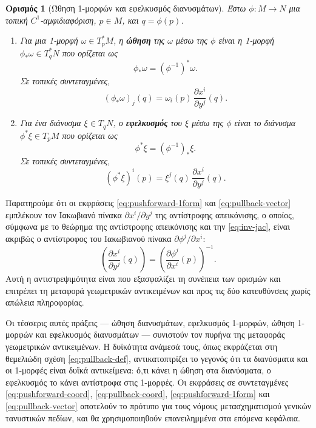 \documentclass[11pt,a4paper,twoside,openright]{book}
\newtheorem{definition}[lemma]{Ορισμός}
\begin{document}
\begin{definition}[Ώθηση 1-μορφών και εφελκυσμός διανυσμάτων]
Έστω $\phi: M \to N$ μια τοπική $C^1$-αμφιδιαφόριση, $p \in M$, και $q = \phi(p)$.

\begin{enumerate}
\item Για μια 1-μορφή $\omega \in T_p^*M$, η \textbf{ώθηση} της $\omega$ μέσω της $\phi$ είναι η 1-μορφή $\phi_* \omega \in T_{q}^*N$ που ορίζεται ως
\begin{equation}
\phi_* \omega = (\phi^{-1})^* \omega.
\end{equation}
Σε τοπικές συντεταγμένες,
\begin{equation}
(\phi_* \omega)_j(q) = \omega_i(p) \, \frac{\partial x^i}{\partial y^j}(q). \label{eq:pushforward-1form}
\end{equation}

\item Για ένα διάνυσμα $\xi \in T_{q}N$, ο \textbf{εφελκυσμός} του $\xi$ μέσω της $\phi$ είναι το διάνυσμα $\phi^* \xi \in T_pM$ που ορίζεται ως
\begin{equation}
\phi^* \xi = (\phi^{-1})_* \xi.
\end{equation}
Σε τοπικές συντεταγμένες,
\begin{equation}
(\phi^* \xi)^i(p) = \xi^j(q) \, \frac{\partial x^i}{\partial y^j}(q). \label{eq:pullback-vector}
\end{equation}
\end{enumerate}
\end{definition}

Παρατηρούμε ότι οι εκφράσεις \eqref{eq:pushforward-1form} και \eqref{eq:pullback-vector} εμπλέκουν τον Ιακωβιανό πίνακα $\partial x^i / \partial y^j$ της αντίστροφης απεικόνισης, ο οποίος, σύμφωνα με το θεώρημα της αντίστροφης απεικόνισης και την \eqref{eq:inv-jac}, είναι ακριβώς ο αντίστροφος του Ιακωβιανού πίνακα $\partial \phi^j / \partial x^i$:
\begin{equation}
\left( \frac{\partial x^i}{\partial y^j}(q) \right) = \left( \frac{\partial \phi^j}{\partial x^i}(p) \right)^{-1}.
\end{equation}
Αυτή η αντιστρεψιμότητα είναι που εξασφαλίζει τη συνέπεια των ορισμών και επιτρέπει τη μεταφορά γεωμετρικών αντικειμένων και προς τις δύο κατευθύνσεις χωρίς απώλεια πληροφορίας.

Οι τέσσερις αυτές πράξεις --- ώθηση διανυσμάτων, εφελκυσμός 1-μορφών, ώθηση 1-μορφών και εφελκυσμός διανυσμάτων --- συνιστούν τον πυρήνα της μεταφοράς γεωμετρικών αντικειμένων. Η δυϊκότητα ανάμεσά τους, όπως εκφράζεται στη θεμελιώδη σχέση \eqref{eq:pullback-def}, αντικατοπτρίζει το γεγονός ότι τα διανύσματα και οι 1-μορφές είναι δυϊκά αντικείμενα: ό,τι κάνει η ώθηση στα διανύσματα, ο εφελκυσμός το κάνει αντίστροφα στις 1-μορφές. Οι εκφράσεις σε συντεταγμένες \eqref{eq:pushforward-coord}, \eqref{eq:pullback-coord}, \eqref{eq:pushforward-1form} και \eqref{eq:pullback-vector} αποτελούν το πρότυπο για τους νόμους μετασχηματισμού γενικών τανυστικών πεδίων, και θα χρησιμοποιηθούν επανειλημμένα στα επόμενα κεφάλαια.
\end{document}
